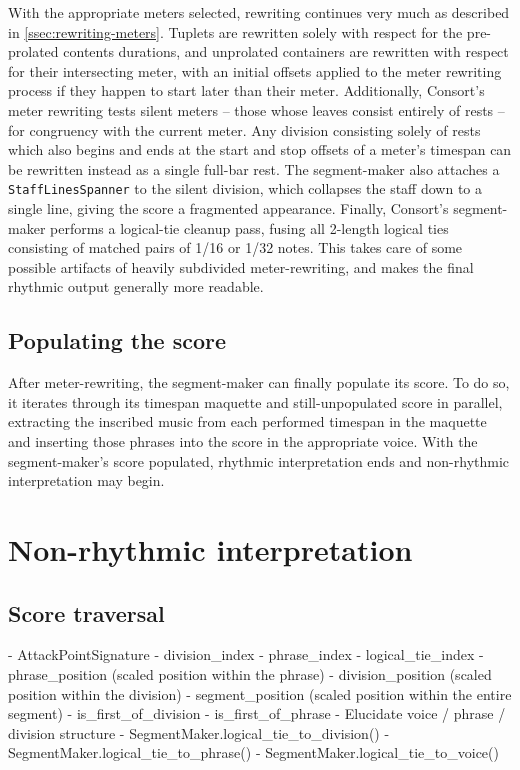\noindent With the appropriate meters selected, rewriting continues very much
as described in \autoref{ssec:rewriting-meters}. Tuplets are rewritten solely
with respect for the pre-prolated contents durations, and unprolated containers
are rewritten with respect for their intersecting meter, with an initial
offsets applied to the meter rewriting process if they happen to start later
than their meter. Additionally, Consort's meter rewriting tests silent meters
-- those whose leaves consist entirely of rests -- for congruency with the
current meter. Any division consisting solely of rests which also begins and
ends at the start and stop offsets of a meter's timespan can be rewritten
instead as a single full-bar rest. The segment-maker also attaches a
\texttt{StaffLinesSpanner} to the silent division, which collapses the staff
down to a single line, giving the score a fragmented appearance. Finally,
Consort's segment-maker performs a logical-tie cleanup pass, fusing all
2-length logical ties consisting of matched pairs of 1/16 or 1/32 notes. This
takes care of some possible artifacts of heavily subdivided meter-rewriting,
and makes the final rhythmic output generally more readable.

\subsection{Populating the score}
\label{ssec:populating-the-score}

After meter-rewriting, the segment-maker can finally populate its score. To do
so, it iterates through its timespan maquette and still-unpopulated score in
parallel, extracting the inscribed music from each performed timespan in the
maquette and inserting those phrases into the score in the appropriate voice.
With the segment-maker's score populated, rhythmic interpretation ends and
non-rhythmic interpretation may begin.

\section{Non-rhythmic interpretation}
\label{sec:non-rhythmic-interpretation}

\subsection{Score traversal}
\label{ssec:score-traversal}

\begin{markdown}
-   AttackPointSignature
    -   division_index
    -   phrase_index
    -   logical_tie_index
    -   phrase_position (scaled position within the phrase)
    -   division_position (scaled position within the division)
    -   segment_position (scaled position within the entire segment)
    -   is_first_of_division
    -   is_first_of_phrase
-   Elucidate voice / phrase / division structure
-   SegmentMaker.logical_tie_to_division()
-   SegmentMaker.logical_tie_to_phrase()
-   SegmentMaker.logical_tie_to_voice()
\end{markdown}


